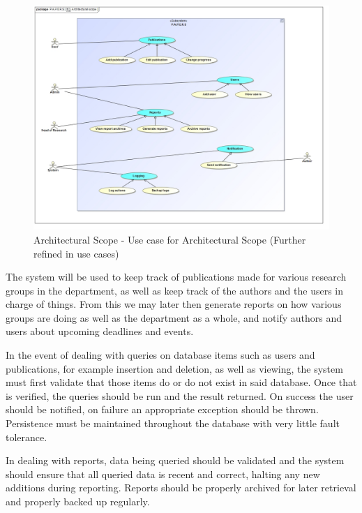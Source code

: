 \documentclass{article}
\begin{document}
	\begin{figure}[H]
		\includegraphics[width=\linewidth]{../Diagrams/Architectural Scope/Architectural scope.jpg}
		\caption{Architectural Scope - Use case for Architectural Scope (Further refined in use cases)}
	\end{figure}
	
	\par The system will be used to keep track of publications made for various research groups in the department, as well as keep track of the authors and the users in charge of things. From this we may later then generate reports on how various groups are doing as well as the department as a whole, and notify authors and users about upcoming deadlines and events.\\
	
	\par In the event of dealing with queries on database items such as users and publications, for example insertion and deletion, as well as viewing, the system must first validate that those items do or do not exist in said database. Once that is verified, the queries should be run and the result returned. On success the user should be notified, on failure an appropriate exception should be thrown. Persistence must be maintained throughout the database with very little fault tolerance.\\
	
	\par In dealing with reports, data being queried should be validated and the system should ensure that all queried data is recent and correct, halting any new additions during reporting. Reports should be properly archived for later retrieval and properly backed up regularly.\\
	
\end{document}
